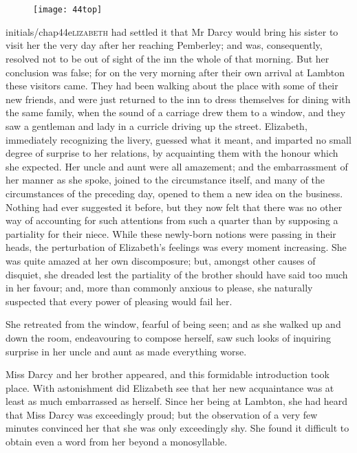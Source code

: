\chapter[Chapter \thechapter]{}
	
	\begin{figure}[t!]
\centering
\texttt{[image: 44top]}
\end{figure}


\lettrine[lines=6,image=true]{initials/chap44e}{lizabeth}  had settled it that Mr Darcy would bring his sister to visit her the very day after her reaching Pemberley; and was, consequently, resolved not to be out of sight of the inn the whole of that morning. But her conclusion was false; for on the very morning after their own arrival at Lambton these visitors came. They had been walking about the place with some of their new friends, and were just returned to the inn to dress themselves for dining with the same family, when the sound of a carriage drew them to a window, and they saw a gentleman and lady in a curricle driving up the street. Elizabeth, immediately recognizing the livery, guessed what it meant, and imparted no small degree of surprise to her relations, by acquainting them with the honour which she expected. Her uncle and aunt were all amazement; and the embarrassment of her manner as she spoke, joined to the circumstance itself, and many of the circumstances of the preceding day, opened to them a new idea on the business. Nothing had ever suggested it before, but they now felt that there was no other way of accounting for such attentions from such a quarter than by supposing a partiality for their niece. While these newly-born notions were passing in their heads, the perturbation of Elizabeth's feelings was every moment increasing. She was quite amazed at her own discomposure; but, amongst other causes of disquiet, she dreaded lest the partiality of the brother should have said too much in her favour; and, more than commonly anxious to please, she naturally suspected that every power of pleasing would fail her.

She retreated from the window, fearful of being seen; and as she walked up and down the room, endeavouring to compose herself, saw such looks of inquiring surprise in her uncle and aunt as made everything worse.

Miss Darcy and her brother appeared, and this formidable introduction took place. With astonishment did Elizabeth see that her new acquaintance was at least as much embarrassed as herself. Since her being at Lambton, she had heard that Miss Darcy was exceedingly proud; but the observation of a very few minutes convinced her that she was only exceedingly shy. She found it difficult to obtain even a word from her beyond a monosyllable.

